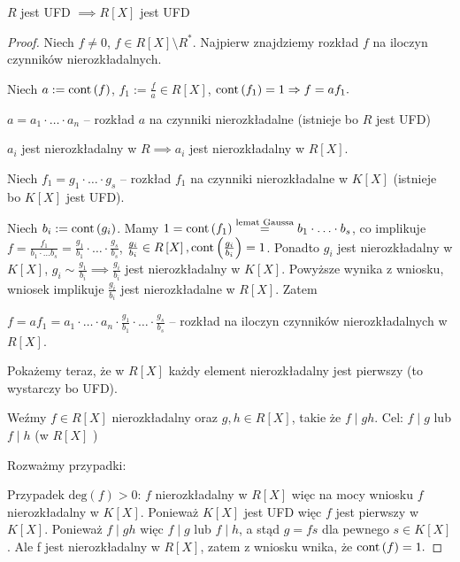\begin{theorem}[Gaussa]
	$R$ jest UFD $\implies R\left[ X \right] $ jest UFD
\end{theorem} 
\begin{proof}
	Niech $f \neq 0$, $f \in R\left[ X \right] \setminus R^{\ast} $. Najpierw znajdziemy rozkład $f$ na iloczyn czynników nierozkładalnych. 

	Niech $a := \operatorname{cont} \left( f \right) $, $f_1:= \frac{f}{a} \in R\left[ X \right] $, $\operatorname{cont} \left( f_1 \right) = 1 \Rightarrow f = af_1.$

	$a = a_1\cdot \ldots\cdot a_{n} $ -- rozkład $a$ na czynniki nierozkładalne (istnieje bo  $R$ jest UFD)

	$a_{i}$ jest nierozkładalny w $R \implies a_{i}$ jest nierozkładalny w $R\left[ X \right] $.

	Niech $f_1 = g_1\cdot \ldots\cdot g_{s}$ -- rozkład $f_1$ na czynniki nierozkładalne w $K\left[ X \right] $ (istnieje bo $K\left[ X \right] $ jest UFD).

	Niech $b_{i} := \operatorname{cont} \left( g_{i} \right) $. Mamy $1 = \operatorname{cont} \left( f_1 \right) \overset{\text{lemat Gaussa}}{=} b_1\cdot \ldots \cdot b_{s}$, co implikuje $f = \frac{f_1}{b_1\cdot \ldots b_{s}} = \frac{g_1}{b_1}\cdot \ldots \cdot \frac{g_{s}}{b_{s}}$, $\frac{g_{i}}{b_{i}} \in R\left[ X \right], \operatorname{cont} \left( \frac{g_{i}}{b_{i}} \right) = 1$. Ponadto $g_{i}$ jest nierozkładalny w $K\left[ X \right] $, $g_{i} \sim \frac{g_{1}}{b_{i}} \implies \frac{g_{i}}{b_{i}} $ jest nierozkładalny w $K\left[ X \right] $. Powyższe wynika z wniosku, wniosek implikuje $\frac{g_{i}}{b_{i}}$ jest nierozkładalne w $R\left[ X \right] $. Zatem 

	$f = af_1 = a_1\cdot \ldots\cdot a_{n} \cdot \frac{g_1}{b_1}\cdot \ldots\cdot \frac{g_{s}}{b_{s}}$ -- rozkład na iloczyn czynników nierozkładalnych w $R\left[ X \right] $. 

	Pokażemy teraz, że w $R\left[ X \right] $ każdy element nierozkładalny jest pierwszy (to wystarczy bo UFD).

	Weźmy $f\in R\left[ X \right] $ nierozkładalny oraz $g,h \in R\left[ X \right] $, takie że $f\mid gh.$ Cel: $f\mid g$ lub $f\mid h$ (w $R\left[ X \right] $ )

	\noindent Rozważmy przypadki:
	
	Przypadek $\text{deg}\left(f\right) > 0$: $f$ nierozkładalny w  $R\left[ X \right] $ więc na mocy wniosku $f$ nierozkładalny w $K\left[ X \right] $. Ponieważ $K\left[ X \right] $ jest UFD więc $f$ jest pierwszy w $K\left[ X \right] $. Ponieważ $f\mid gh$ więc $f\mid g$ lub $f\mid h$, a stąd $g = fs $ dla pewnego $s\in K\left[ X \right] $. Ale f jest nierozkładalny w $R\left[ X \right] $, zatem z wniosku wnika, że $\operatorname{cont} \left( f \right) = 1.$


\end{proof}
